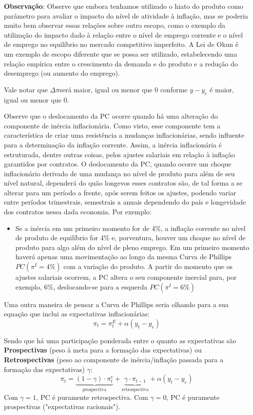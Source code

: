 \documentclass[a4paper,12pt]{article}[abntex2]
\begin{document}
\textbf{Observação}: Observe que embora tenhamos utilizado o hiato do produto como parâmetro para avaliar o impacto do nível de atividade à inflação, mas se poderia muito bem observar essas relações sobre outro escopo, como o exemplo da utilização do impacto dado à relação entre o nível de emprego corrente e o nível de emprego no equilíbrio no mercado competitivo imperfeito. A Lei de Okun é um exemplo de escopo diferente que se possa ser utilizado, estabelecendo uma relação empírica entre o crescimento da demanda e do produto e a redução do desemprego (ou aumento do emprego). 

Vale notar que \(\Delta \pi\)será maior, igual ou menor que 0 conforme \(y-y_e\)  é maior, igual ou menor que 0.

Observe que o deslocamento da PC ocorre quando há uma alteração do componente de inércia inflacionária. Como visto, esse componente tem a característica de criar uma resistência a mudanças inflacionárias, sendo influente para a determinação da inflação corrente. Assim, a inércia inflacionária é estruturada, dentre outras coisas, pelos ajustes salariais em relação à inflação  garantidos por contratos. O deslocamento da PC, quando ocorre um choque inflacionário derivado de uma mudança no nível de produto para além de seu nível natural, dependerá do quão longevos esses contratos são, de tal forma a se alterar para um período a frente, após serem feitos os ajustes, podendo variar entre períodos trimestrais, semestrais a anuais dependendo do país e longevidade dos contratos nessa dada economia. Por exemplo: \begin{itemize}
    \item Se a inércia em um primeiro momento for de 4\%, a inflação corrente no nível de produto de equilíbrio for 4\% e, porventura, houver um choque no nível de produto para algo além  do  nível  de  pleno  emprego.  Em  um  primeiro  momento  haverá  apenas  uma movimentação ao longo da mesma Curva de Phillips \(PC(\pi^I=4\%)\) com a variação do produto. A partir do momento que os ajustes salariais ocorrem, a PC altera o seu componente  inercial  para,  por  exemplo,  6\%,  deslocando-se  para  a  esquerda \(PC(\pi^I=6\%)\)
\end{itemize}

Uma outra maneira de pensar a Curva de Phillips seria olhando para a sua equação que inclui as expectativas inflacionárias: 
\[
\pi_t=\pi_t^E+\alpha(y_t-y_e)
\]

Sendo que há uma participação ponderada entre o quanto as expectativas são \textbf{Prospectivas} (peso à meta para a formação das expectativas) ou \textbf{Retrospectivas} (peso ao componente de inércia/inflação passada para a formação das expectativas) \(\gamma\):
\[
\pi_t=\underbrace{(1-\gamma)\cdot\pi_t^e}_\text{prospectiva}+\underbrace{\gamma\cdot\pi_{t-1}}_\text{retrospectiva}+\alpha(y_t-y_e)
\]
Com \(\gamma=1\), PC é puramente retrospectiva. Com \(\gamma = 0\), PC é  puramente prospectivas ("expectativas racionais").
\end{document}
